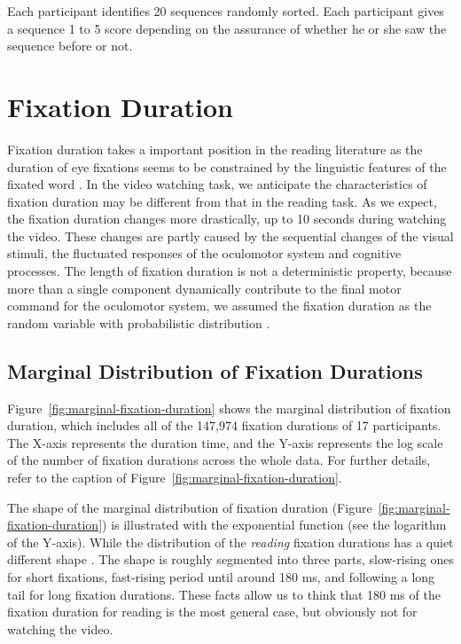 \documentclass[10pt,letterpaper]{article}
\begin{document}
Each participant identifies 20 sequences randomly sorted. Each participant gives a sequence 1 to 5 score depending on the assurance of whether he or she saw the sequence before or not. 

\section{Fixation Duration}

Fixation duration takes a important position in the reading literature as the duration of eye fixations seems to be constrained by the linguistic features of the fixated word \cite{Rayner1998}. In the video watching task, we anticipate the characteristics of fixation duration may be different from that in the reading task. As we expect, the fixation duration changes more drastically, up to 10 seconds during watching the video. These changes are partly caused by the sequential changes of the visual stimuli, the fluctuated responses of the oculomotor system and cognitive processes. The length of fixation duration is not a deterministic property, because more than a single component dynamically contribute to the final motor command for the oculomotor system, we assumed the fixation duration as the random variable with probabilistic distribution \cite{Rayner1998,Reichle2004,Reichle2006}.

\subsection{Marginal Distribution of Fixation Durations}

Figure~\ref{fig:marginal-fixation-duration} shows the marginal distribution of fixation duration, which includes all of the 147,974 fixation durations of 17 participants. The X-axis represents the duration time, and the Y-axis represents the log scale of the number of fixation durations across the whole data. For further details, refer to the caption of Figure~\ref{fig:marginal-fixation-duration}.

The shape of the marginal distribution of fixation duration (Figure~\ref{fig:marginal-fixation-duration}) is illustrated with the exponential function (see the logarithm of the Y-axis). While the distribution of the \textit{reading} fixation durations has a quiet different shape \cite{Feng2006}. The shape is roughly segmented into three parts, slow-rising ones for short fixations, fast-rising period until around 180 ms, and following a long tail for long fixation durations. These facts allow us to think that 180 ms of the fixation duration for reading is the most general case, but obviously not for watching the video.
\end{document}
